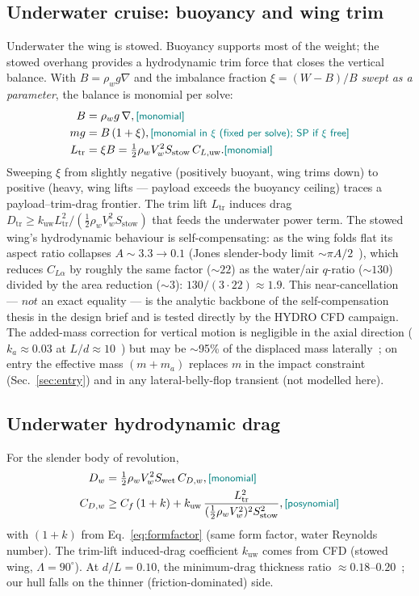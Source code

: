 \documentclass[conf]{new-aiaa}
\newcommand{\gpc}[1]{\textcolor{teal}{\small\textsf{[#1]}}} %
\begin{document}
\subsection{Underwater cruise: buoyancy and wing trim}\label{sec:buoyancy}
Underwater the wing is stowed. Buoyancy supports most of the weight; the stowed overhang provides a
hydrodynamic trim force that closes the vertical balance. With $B=\rho_w g\nabla$ and the imbalance
fraction $\xi=(W-B)/B$ \emph{swept as a parameter}, the balance is monomial per solve:
\begin{align}
B   &= \rho_w g\, \nabla, \gpc{monomial}\\
m g &= B\,(1+\xi),        \gpc{monomial in $\xi$ (fixed per solve); SP if $\xi$ free}\\
L_{\text{tr}} &= \xi B = \tfrac12\rho_w V_w^2 S_{\text{stow}}\,C_{L,\text{uw}}. \gpc{monomial}
\end{align}
Sweeping $\xi$ from slightly negative (positively buoyant, wing trims down) to positive (heavy,
wing lifts — payload exceeds the buoyancy ceiling) traces a payload--trim-drag frontier. The trim
lift $L_{\text{tr}}$ induces drag $D_{\text{tr}}\ge k_{\text{uw}} L_{\text{tr}}^2/
(\tfrac12\rho_w V_w^2 S_{\text{stow}})$ that feeds the underwater power term.
The stowed wing's hydrodynamic behaviour is self-compensating: as the wing folds flat its aspect
ratio collapses $A\sim3.3 \to 0.1$ (Jones slender-body limit $\sim\pi A/2$~\cite{hoerner1985fluid}),
which reduces $C_{L\alpha}$ by roughly the same factor ($\sim22$) as the water/air $q$-ratio
($\sim130$) divided by the area reduction ($\sim3$): $130/(3\cdot22)\approx1.9$. This
near-cancellation — $\textit{not}$ an exact equality — is the analytic backbone of the
self-compensation thesis in the design brief and is tested directly by the HYDRO CFD campaign.
The added-mass correction for vertical motion is negligible in the axial direction
($k_a\approx0.03$ at $L/d\approx10$~\cite{newman2018marine}) but may be $\sim$95\% of the
displaced mass laterally~\cite{newman2018marine}; on entry the effective mass $(m+m_a)$ replaces
$m$ in the impact constraint (Sec.~\ref{sec:entry}) and in any lateral-belly-flop transient (not
modelled here).

\subsection{Underwater hydrodynamic drag}
For the slender body of revolution,
\begin{align}
D_w      &= \tfrac12\rho_w V_w^2 S_{\text{wet}}\,C_{D,w}, \gpc{monomial}\\
C_{D,w}  &\ge C_f\,(1+k) + k_{\text{uw}}\,
            \frac{L_{\text{tr}}^2}{(\tfrac12\rho_w V_w^2)^2 S_{\text{stow}}^2}, \gpc{posynomial}
\end{align}
with $(1+k)$ from Eq.~\eqref{eq:formfactor} (same form factor, water Reynolds number). The trim-lift
induced-drag coefficient $k_{\text{uw}}$ comes from CFD (stowed wing, $\Lambda=90^\circ$). At
$d/L=0.10$, the minimum-drag thickness ratio $\approx 0.18$--$0.20$~\cite{hoerner1965fluid}; our
hull falls on the thinner (friction-dominated) side.
\end{document}
